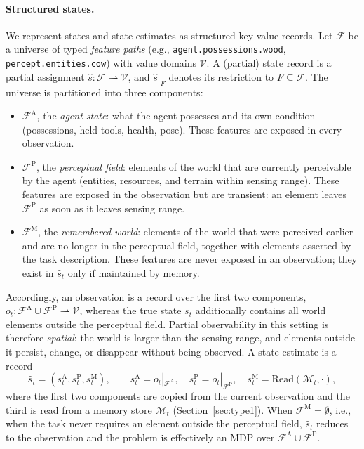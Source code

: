\documentclass[11pt]{article}
\newcommand{\calF}{\mathcal{F}}
\newcommand{\calV}{\mathcal{V}}
\newcommand{\calM}{\mathcal{M}}
\newcommand{\shat}{\hat{s}}
\newcommand{\sA}{s^{\mathrm{A}}}
\newcommand{\sP}{s^{\mathrm{P}}}
\newcommand{\sM}{s^{\mathrm{M}}}
\newcommand{\FA}{\calF^{\mathrm{A}}}
\newcommand{\FP}{\calF^{\mathrm{P}}}
\newcommand{\FM}{\calF^{\mathrm{M}}}
\newcommand{\Read}{\mathrm{Read}}
\begin{document}
\paragraph{Structured states.}
We represent states and state estimates as structured key-value records. Let $\calF$ be a universe of typed \emph{feature paths} (e.g., \texttt{agent.possessions.wood}, \texttt{percept.entities.cow}) with value domains $\calV$. A (partial) state record is a partial assignment $\shat:\calF\rightharpoonup\calV$, and $\shat|_{F}$ denotes its restriction to $F\subseteq\calF$. The universe is partitioned into three components:
\begin{itemize}[leftmargin=1.5em,itemsep=1pt]
\item $\FA$, the \emph{agent state}: what the agent possesses and its own condition (possessions, held tools, health, pose). These features are exposed in every observation.
\item $\FP$, the \emph{perceptual field}: elements of the world that are currently perceivable by the agent (entities, resources, and terrain within sensing range). These features are exposed in the observation but are transient: an element leaves $\FP$ as soon as it leaves sensing range.
\item $\FM$, the \emph{remembered world}: elements of the world that were perceived earlier and are no longer in the perceptual field, together with elements asserted by the task description. These features are never exposed in an observation; they exist in $\shat_t$ only if maintained by memory.
\end{itemize}
Accordingly, an observation is a record over the first two components, $o_t:\FA\cup\FP\rightharpoonup\calV$, whereas the true state $s_t$ additionally contains all world elements outside the perceptual field. Partial observability in this setting is therefore \emph{spatial}: the world is larger than the sensing range, and elements outside it persist, change, or disappear without being observed. A state estimate is a record
\begin{equation}
\shat_t=(\sA_t,\sP_t,\sM_t),\qquad \sA_t=o_t|_{\FA},\quad \sP_t=o_t|_{\FP},\quad \sM_t=\Read(\calM_t,\cdot),
\label{eq:state-estimate}
\end{equation}
where the first two components are copied from the current observation and the third is read from a memory store $\calM_t$ (Section~\ref{sec:type1}). When $\FM=\emptyset$, i.e., when the task never requires an element outside the perceptual field, $\shat_t$ reduces to the observation and the problem is effectively an MDP over $\FA\cup\FP$.
\end{document}
